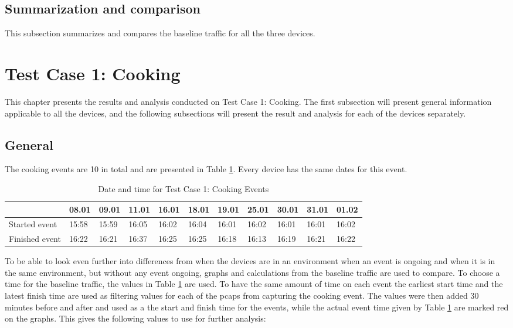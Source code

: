 \subsection{Summarization and comparison}
This subsection summarizes and compares the baseline traffic for all the three devices.





\section{Test Case 1: Cooking}
This chapter presents the results and analysis conducted on Test Case 1: Cooking. The first subsection will present general information applicable to all the devices, and the following subsections will present the result and analysis for each of the devices separately. 
\subsection{General}
The cooking events are 10 in total and are presented in Table \ref{tab:CookingDates}. Every device has the same dates for this event. 
\begin{table}[!hbtp]
    \centering
    \caption{Date and time for Test Case 1: Cooking Events}
    \begin{adjustbox}{width=1\textwidth}
            \begin{tabular}{l|l|l|l|l|l|l|l|l|l|l|}
            \cline{2-11} & 08.01 & 09.01 & 11.01 & 16.01 & 18.01 & 19.01 & 25.01 & 30.01 & 31.01 & 01.02 \\
            \hline
            \multicolumn{1}{|l|}{Started event}  & 15:58 & 15:59 & 16:05 & 16:02 & 16:04 & 16:01 & 16:02 & 16:01 & 16:01 & 16:02 \\ 
            \hline
            \multicolumn{1}{|l|}{Finished event} & 16:22 & 16:21 & 16:37 & 16:25 & 16:25 & 16:18 & 16:13 & 16:19 & 16:21 & 16:22 \\ \hline
            \end{tabular}
    \end{adjustbox}
    \label{tab:CookingDates}
\end{table}
\FloatBarrier

To be able to look even further into differences from when the devices are in an environment when an event is ongoing and when it is in the same environment, but without any event ongoing, graphs and calculations from the baseline traffic are used to compare. To choose a time for the baseline traffic, the values in Table \ref{tab:CookingDates} are used. To have the same amount of time on each event the earliest start time and the latest finish time are used as filtering values for each of the pcaps from capturing the cooking event. The values were then added 30 minutes before and after and used as a the start and finish time for the events, while the actual event time given by Table \ref{tab:CookingDates} are marked red on the graphs. This gives the following values to use for further analysis:


